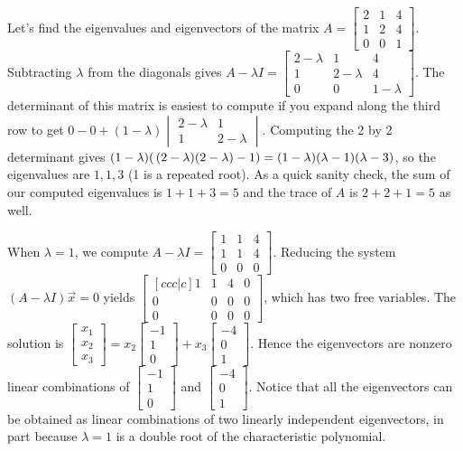 \begin{example}\label{eigenvalueexample3} \label{ex eigen2}
Let's find the eigenvalues and eigenvectors of the matrix 
$A=\begin{bmatrix}2&1&4\\ 1&2&4\\ 0&0&1\end{bmatrix}$. 
Subtracting $\lambda$ from the diagonals gives 
$A-\lambda I=\begin{bmatrix}2-\lambda&1&4\\ 1&2-\lambda&4\\ 0&0&1-\lambda\end{bmatrix}$. The determinant of this matrix is easiest to compute if you expand along the third row to get $0 - 0 + (1-\lambda) \begin{vmatrix} 2-\lambda&1\\1&2-\lambda\end{vmatrix}$. Computing the 2 by 2 determinant gives $(1-\lambda)(\thinspace(2-\lambda)(2-\lambda)-1) = (1-\lambda)(\lambda-1)(\lambda-3)$,  so the eigenvalues are $1,1,3$ (1 is a repeated root). As a quick sanity check, the sum of our computed eigenvalues is $1+1+3=5$ and the trace of $A$ is $2+2+1=5$ as well.

When $\lambda=1$, we compute $A-\lambda I =\begin{bmatrix}1&1&4\\ 1&1&4\\ 0&0&0\end{bmatrix} $. Reducing the system  $(A-\lambda I )\vec x=0$ yields $\begin{bmatrix}[ccc|c]1&1&4&0\\ 0&0&0&0\\ 0&0&0&0\end{bmatrix}$, which has two free variables. The solution is $\begin{bmatrix} x_1\\x_2\\ x_3\end{bmatrix} = x_2\begin{bmatrix} -1\\1\\0\end{bmatrix}+x_3\begin{bmatrix} -4\\0\\1\end{bmatrix} $. Hence the eigenvectors are nonzero linear combinations of $\begin{bmatrix} -1\\1\\0\end{bmatrix}$ and $\begin{bmatrix} -4\\0\\1\end{bmatrix}$. Notice that all the eigenvectors can be obtained as linear combinations of two linearly independent eigenvectors, in part because $\lambda =1$ is a double root of the characteristic polynomial. 


\end{example}
